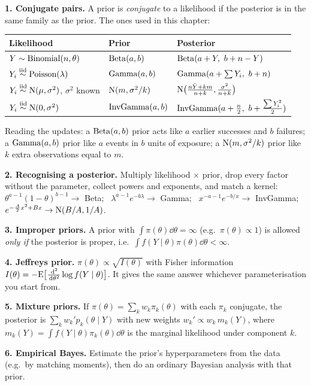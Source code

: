 \documentclass[11pt]{article}
\begin{document}
\begin{recall}
\textbf{1. Conjugate pairs.} A prior is \emph{conjugate} to a likelihood if the posterior is in the same family as the prior. The ones used in this chapter:
\begin{center}
\small
\begin{tabular}{lll}\toprule
Likelihood & Prior & Posterior\\\midrule
$Y\sim\mathrm{Binomial}(n,\theta)$ & $\mathrm{Beta}(a,b)$ & $\mathrm{Beta}(a+Y,\ b+n-Y)$\\
$Y_i\stackrel{\text{iid}}{\sim}\mathrm{Poisson}(\lambda)$ & $\mathrm{Gamma}(a,b)$ & $\mathrm{Gamma}(a+\sum Y_i,\ b+n)$\\
$Y_i\stackrel{\text{iid}}{\sim}\mathrm{N}(\mu,\sigma^2)$, $\sigma^2$ known & $\mathrm{N}(m,\sigma^2/k)$ & $\mathrm{N}\big(\frac{n\bar Y+km}{n+k},\frac{\sigma^2}{n+k}\big)$\\
$Y_i\stackrel{\text{iid}}{\sim}\mathrm{N}(0,\sigma^2)$ & $\mathrm{InvGamma}(a,b)$ & $\mathrm{InvGamma}(a+\frac n2,\ b+\frac{\sum Y_i^2}2)$\\\bottomrule
\end{tabular}

\smallskip
Reading the updates: a $\mathrm{Beta}(a,b)$ prior acts like $a$ earlier successes and $b$ failures; a $\mathrm{Gamma}(a,b)$ prior like $a$ events in $b$ units of exposure; a $\mathrm{N}(m,\sigma^2/k)$ prior like $k$ extra observations equal to $m$.
\end{center}

\medskip
\textbf{2. Recognising a posterior.} Multiply likelihood $\times$ prior, drop every factor without the parameter, collect powers and exponents, and match a kernel:
$\theta^{a-1}(1-\theta)^{b-1}\to$ Beta; \ $\lambda^{a-1}e^{-b\lambda}\to$ Gamma; \ $x^{-a-1}e^{-b/x}\to$ InvGamma; \ $e^{-\frac{A}{2}x^2+Bx}\to\mathrm{N}(B/A,1/A)$.

\medskip
\textbf{3. Improper priors.} A prior with $\int\pi(\theta)\dd\theta=\infty$ (e.g.\ $\pi(\theta)\propto1$) is allowed \emph{only if} the posterior is proper, i.e.\ $\int f(Y\mid\theta)\pi(\theta)\dd\theta<\infty$.

\medskip
\textbf{4. Jeffreys prior.} $\pi(\theta)\propto\sqrt{I(\theta)}$ with Fisher information $I(\theta)=-\mathrm{E}\big[\frac{\,\mathrm{d}^2}{\,\mathrm{d}\theta^2}\log f(Y\mid\theta)\big]$. It gives the same answer whichever parameterisation you start from.

\medskip
\textbf{5. Mixture priors.} If $\pi(\theta)=\sum_kw_k\pi_k(\theta)$ with each $\pi_k$ conjugate, the posterior is $\sum_kw_k'p_k(\theta\mid Y)$ with new weights $w_k'\propto w_k\,m_k(Y)$, where $m_k(Y)=\int f(Y\mid\theta)\pi_k(\theta)\dd\theta$ is the marginal likelihood under component $k$.

\medskip
\textbf{6. Empirical Bayes.} Estimate the prior's hyperparameters from the data (e.g.\ by matching moments), then do an ordinary Bayesian analysis with that prior.
\end{recall}
\end{document}
